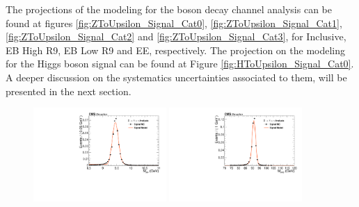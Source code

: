 The projections of the modeling for the \Z boson decay channel analysis can be found at figures \ref{fig:ZToUpsilon_Signal_Cat0}, \ref{fig:ZToUpsilon_Signal_Cat1}, \ref{fig:ZToUpsilon_Signal_Cat2} and \ref{fig:ZToUpsilon_Signal_Cat3}, for Inclusive, EB High R9, EB Low R9 and EE, respectively. The projection on the modeling for the Higgs boson signal can be found at Figure \ref{fig:HToUpsilon_Signal_Cat0}. A deeper discussion on the systematics uncertainties associated to them, will be presented in the next section.



\begin{figure}[!htbp]
\begin{center}


\includegraphics[width=0.45\textwidth]{figures/fitPlotFiles2D/ZToUpsilonPhotonSignalAndBackgroundFit/mMuMNU_ZToUpsilon1SPhotonSignalAndBackgroundFit_Signal_Cat0}\hspace*{1.cm}
\includegraphics[width=0.45\textwidth]{figures/fitPlotFiles2D/ZToUpsilonPhotonSignalAndBackgroundFit/mHZ_ZToUpsilon1SPhotonSignalAndBackgroundFit_Signal_Cat0_default}\hspace*{1.cm}


\end{center}
\end{figure}

